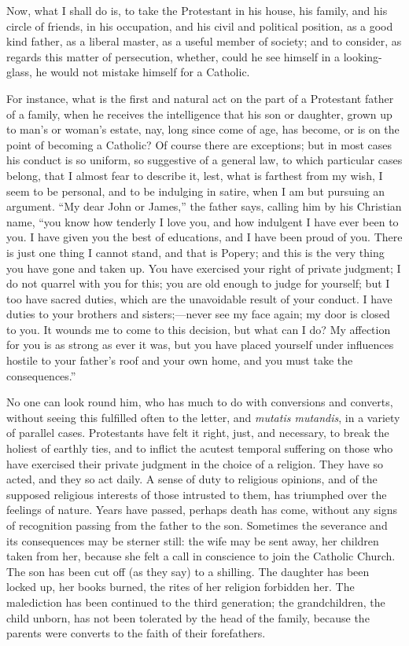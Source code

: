 Now, what I shall do is, to take the Protestant in his
house, his family, and his circle of friends, in his
occupation, and his civil and political position, as a good kind father, as a liberal master, as a useful member
of society; and to consider, as regards this matter of
persecution, whether, could he see himself in a
looking-glass, he would not mistake himself for a
Catholic.

For instance, what is the first and natural act on the
part of a Protestant father of a family, when he receives
the intelligence that his son or daughter, grown up to
man's or woman's estate, nay, long since come of age, has
become, or is on the point of becoming a Catholic? Of
course there are exceptions; but in most cases his
conduct is so uniform, so suggestive of a general law, to
which particular cases belong, that I almost fear to
describe it, lest, what is farthest from my wish, I seem
to be personal, and to be indulging in satire, when I am
but pursuing an argument. ``My dear John or
James,'' the father says, calling him by his
Christian name, ``you know how tenderly I love you,
and how indulgent I have ever been to you. I have given
you the best of educations, and I have been proud of you.
There is just one thing I cannot stand, and that is
Popery; and this is the very thing you have gone and
taken up. You have exercised your right of private
judgment; I do not quarrel with you for this; you are old
enough to judge for yourself; but I too have sacred
duties, which are the unavoidable result of your conduct.
I have duties to your brothers and sisters;—never see my
face again; my door is closed to you. It wounds me to
come to this decision, but what can I do? My affection
for you is as strong as ever it was, but you have placed
yourself under influences hostile to your father's roof
and your own home, and you must take the
consequences.''

No one can look round him, who has much to do with
conversions and converts, without seeing this fulfilled
often to the letter, and \emph{mutatis mutandis}, in a
variety of parallel cases. Protestants have felt it
right, just, and necessary, to break the holiest of
earthly ties, and to inflict the acutest temporal
suffering on those who have exercised their private
judgment in the choice of a religion. They have so acted,
and they so act daily. A sense of duty to religious
opinions, and of the supposed religious interests of
those intrusted to them, has triumphed over the feelings
of nature. Years have passed, perhaps death has come,
without any signs of recognition passing from the father
to the son. Sometimes the severance and its consequences
may be sterner still: the wife may be sent away, her
children taken from her, because she felt a call in
conscience to join the Catholic Church. The son has been
cut off (as they say) to a shilling. The daughter has
been locked up, her books burned, the rites of her
religion forbidden her. The malediction has been
continued to the third generation; the grandchildren, the
child unborn, has not been tolerated by the head of the
family, because the parents were converts to the faith of
their forefathers.

